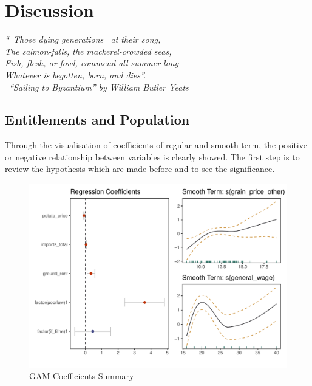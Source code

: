 \chapter{Discussion}

\textit{``\textendash\ Those dying generations \textendash\ at their song,\\
The salmon-falls, the mackerel-crowded seas,\\
Fish, flesh, or fowl, commend all summer long\\
Whatever is begotten, born, and dies''.\\
\textemdash\ ``Sailing to Byzantium'' by William Butler Yeats }

\vspace{.2cm}

\section{Entitlements and Population}

Through the visualisation of coefficients of regular and smooth term, the positive or negative relationship between variables is clearly showed. The first step is to review the hypothesis which are made before and to see the significance.

\begin{figure}[h]
    \centering
    \caption{GAM Coefficients Summary}
    \includegraphics[width=.95\textwidth]{../03_outputs/coef.visual.pdf}
\end{figure}
\vspace{-7pt}

